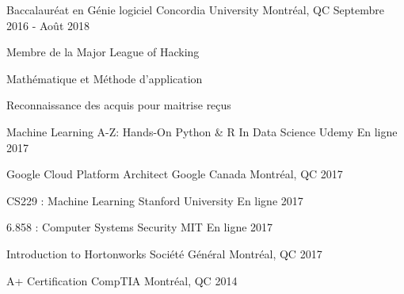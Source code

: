 

\begin{cventries}

  \cventry
    {Baccalauréat en Génie logiciel}
    {Concordia University}
    {Montréal, QC}
    {Septembre 2016 - Août 2018}
    {
      \begin{cvitems}
        \item {Membre de la Major League of Hacking}
        \item {Mathématique et Méthode d’application}
        \item {Reconnaissance des acquis pour maitrise reçus}
      \end{cvitems}
    }

\end{cventries}

\begin{cvhonors}

  \cvhonor
    {Machine Learning A-Z: Hands-On Python \& R In Data Science}
    {Udemy}
    {En ligne}
    {2017}
    
  \cvhonor
    {Google Cloud Platform Architect}
    {Google Canada}
    {Montréal, QC}
    {2017}

  \cvhonor
    {CS229 : Machine Learning}
    {Stanford University}
    {En ligne}
    {2017}

  \cvhonor
    {6.858 : Computer Systems Security}
    {MIT}
    {En ligne}
    {2017}

  \cvhonor
    {Introduction to Hortonworks}
    {Société Général}
    {Montréal, QC}
    {2017}
	
  \cvhonor
    {A+ Certification}
    {CompTIA}
    {Montréal, QC}
    {2014}

\end{cvhonors}